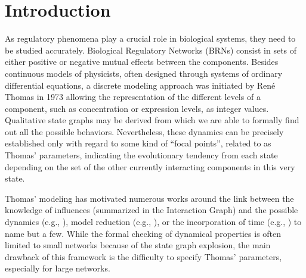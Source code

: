 \section{Introduction}
As regulatory phenomena play a crucial role in biological systems, they need to be studied accurately.
Biological Regulatory Networks (BRNs) consist in sets of either positive or negative mutual effects between the components.
Besides continuous models of physicists, often designed through systems of ordinary
differential equations, a discrete modeling approach was initiated by René Thomas in 1973
\cite{Thomas73} allowing the representation of the different levels of a component, such as concentration or expression levels, as integer values.
Qualitative state graphs may be derived from which we are able to formally find out all the possible behaviors. %
Nevertheless, these dynamics can be precisely established only with regard to some kind of ``focal points'', related to as Thomas' parameters, indicating the evolutionary tendency from each state depending on the set of the other currently interacting components in this very state.

Thomas' modeling has motivated numerous works around the link between the knowledge of influences
(summarized in the Interaction Graph) and the possible dynamics (e.g., \cite{RiCo07}), %
model reduction (e.g., \cite{Naldi09}), %
or the incorporation of time (e.g., \cite{Siebert06}) %
to name but a few.
While the formal checking of dynamical properties is often limited to small networks because of the
state graph explosion, the main drawback of this framework is the difficulty to specify Thomas'
parameters, especially for large networks.

